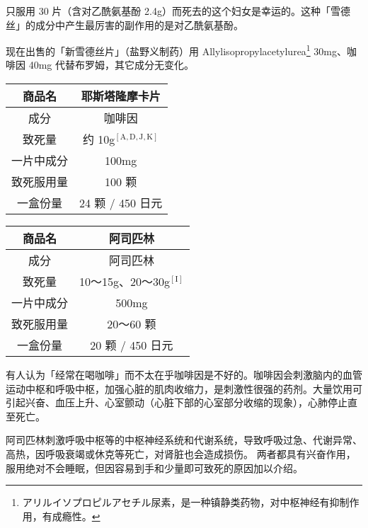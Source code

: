 \documentclass[UTF8]{ctexart}
\begin{document}
只服用 30 片（含对乙酰氨基酚 2.4g）而死去的这个妇女是幸运的。这种「雪德丝」的成分中产生最厉害的副作用的是对乙酰氨基酚。

现在出售的「新雪德丝片」（盐野义制药）用 Allylisopropylacetylurea\footnote{アリルイソプロピルアセチル尿素，是一种镇静类药物，对中枢神经有抑制作用，有成瘾性。} 30mg、咖啡因 40mg 代替布罗姆，其它成分无变化。

\begin{table}[htbp]
\begin{center}
\begin{tabular}{cc}

\toprule
商品名 & 耶斯塔隆摩卡片 \\
\midrule
成分 & 咖啡因 \\
致死量 & 约 10g$^\mathrm{[A,D,J,K]}$ \\
一片中成分 & 100mg \\
致死服用量 & 100 颗 \\
一盒份量 & 24 颗 / 450 日元 \\
\bottomrule
\end{tabular}
\end{center}
\end{table}

\begin{table}[htbp]
\begin{center}
\begin{tabular}{cc}

\toprule
商品名 & 阿司匹林 \\
\midrule
成分 & 阿司匹林 \\
致死量 & 10～15g、20～30g$^\mathrm{[I]}$ \\
一片中成分 & 500mg \\
致死服用量 & 20～60 颗 \\
一盒份量 & 20 颗 / 450 日元 \\
\bottomrule
\end{tabular}
\end{center}
\end{table}

有人认为「经常在喝咖啡」而不太在乎咖啡因是不好的。咖啡因会刺激脑内的血管运动中枢和呼吸中枢，加强心脏的肌肉收缩力，是刺激性很强的药剂。大量饮用可引起兴奋、血压上升、心室颤动（心脏下部的心室部分收缩的现象），心肺停止直至死亡。

阿司匹林刺激呼吸中枢等的中枢神经系统和代谢系统，导致呼吸过急、代谢异常、高热，因呼吸衰竭或休克等死亡，对肾脏也会造成损伤。 两者都具有兴奋作用，服用绝对不会睡眠，但因容易到手和少量即可致死的原因加以介绍。
\end{document}

